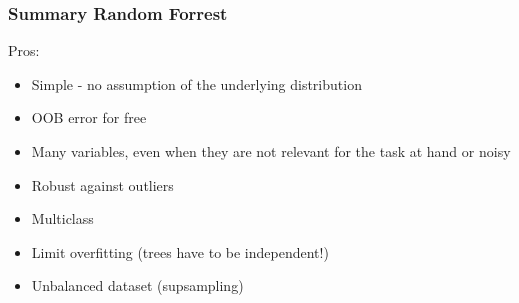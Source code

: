 \subsubsection{Summary Random Forrest}
Pros:
\begin{itemize}
    \item Simple - no assumption of the underlying distribution
    \item OOB error for free
    \item Many variables, even when they are not relevant for the task at hand or noisy
    \item Robust against outliers
    \item Multiclass
    \item Limit overfitting (trees have to be independent!)
    \item Unbalanced dataset (supsampling)
\end{itemize}